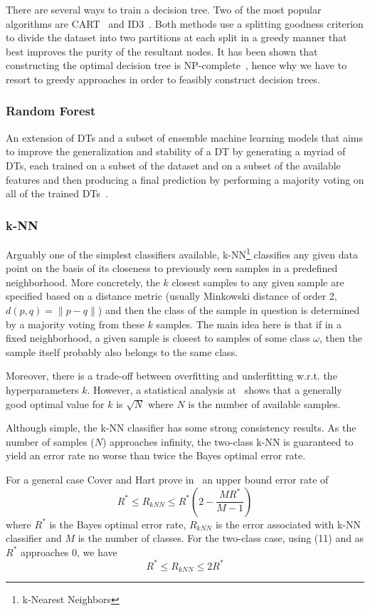 \documentclass[journal,onecolumn]{IEEEtran}
\begin{document}
There are several ways to train a decision tree. Two of the most popular algorithms are CART~\cite{cart} and ID3~\cite{id3dt}.
Both methods use a splitting goodness criterion to divide the dataset into two partitions at each split in a greedy manner
that best improves the purity of the resultant nodes. It has been shown that constructing the optimal decision tree is NP-complete~\cite{dtnpcom}, 
hence why we have to resort to greedy approaches in order to feasibly construct decision trees.


\subsubsection{Random Forest}
An extension of DTs and a subset of ensemble machine learning models that aims to improve the generalization and stability of
a DT by generating a myriad of DTs, each trained on a subset of the dataset and on a subset of the available features and then
producing a final prediction by performing a majority voting on all of the trained DTs~\cite{randomforests}.

\subsubsection{k-NN}
Arguably one of the simplest classifiers available, k-NN\footnote{k-Nearest Neighbors} classifies any given data point on the basis
of its closeness to previously seen samples in a predefined neighborhood. More concretely, the $k$ closest samples to any given sample
are specified based on a distance metric (usually Minkowski distance of order 2, $d(p, q) = \|p-q\|$) and then the class of the sample
in question is determined by a majority voting from these $k$ samples. The main idea here is that if in a fixed neighborhood, a given sample
is closest to samples of some class $\omega$, then the sample itself probably also belongs to the same class.~\cite{knn}

Moreover, there is a trade-off between overfitting and underfitting w.r.t. the hyperparameters $k$. However, a statistical analysis at~\cite{kinknn}
shows that a generally good optimal value for $k$ is $\sqrt{N}$ where $N$ is the number of available samples. 

Although simple, the k-NN classifier has some strong consistency results. As the number of samples ($N$) approaches infinity,
the two-class k-NN is guaranteed to yield an error rate no worse than twice the Bayes optimal error rate.

For a general case Cover and Hart prove in~\cite{knnbounds} an upper bound error rate of
\begin{equation}
  R^* \le R_{kNN} \le R^*(2-\frac{MR^*}{M-1})
\end{equation}
where $R^*$ is the Bayes optimal error rate, $R_{kNN}$ is the error associated with k-NN classifier
and $M$ is the number of classes. For the two-class case, using (11) and as $R^*$ approaches 0, we have
\begin{equation}
  R^* \le R_{kNN} \le 2R^*
\end{equation}
\end{document}
